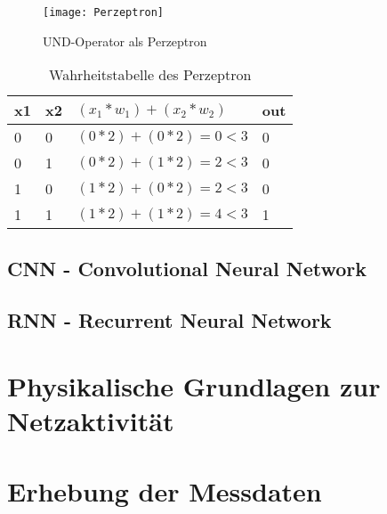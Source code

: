     \begin{figure}[H]
        \centering
        \texttt{[image: Perzeptron]}
        \caption{UND-Operator als Perzeptron}
        \label{fig:PerzeptronAND}
    \end{figure}

    \begin{table}[H]
        \centering
        \begin{tabular}{|l|l|l|l|}
            \hline
            x1 & x2 & \( (x_1 * w_1) + (x_2 * w_2) \) & out \\
            \hline
            0 & 0 & \( (0 * 2) + (0 * 2) = 0 < 3 \) & 0 \\
            \hline
            0 & 1 & \( (0 * 2) + (1 * 2) = 2 < 3 \) & 0 \\
            \hline
            1 & 0 & \( (1 * 2) + (0 * 2) = 2 < 3 \) & 0 \\
            \hline
            1 & 1 & \( (1 * 2) + (1 * 2) = 4 < 3 \) & 1 \\
            \hline
        \end{tabular}
        \caption{Wahrheitstabelle des Perzeptron}
        \label{tabl:Perzeptron}
    \end{table}

    \subsection{CNN - Convolutional Neural Network}
    \subsection{RNN - Recurrent Neural Network}



\section{Physikalische Grundlagen zur Netzaktivität} \label{physikalischeGrundlagen}

\section{Erhebung der Messdaten} \label{Messdaten}

